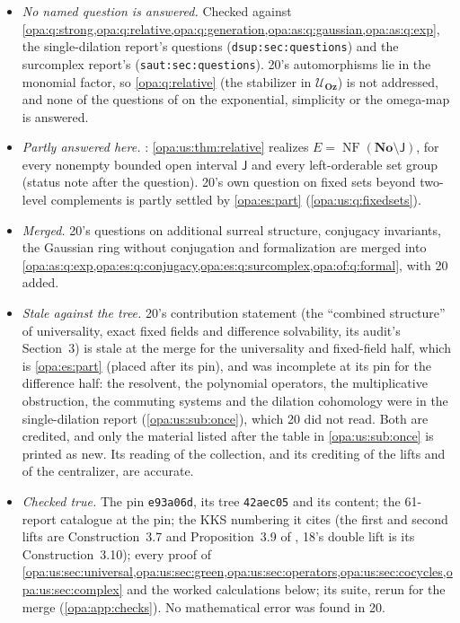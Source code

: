 \documentclass[11pt,oneside]{article}
\numberwithin{equation}{section}
\theoremstyle{definition}
\theoremstyle{remark}
\newcommand{\No}{\mathbf{No}}
\newcommand{\Oz}{\mathbf{Oz}}
\newcommand{\UU}{\mathcal U}
\newcommand{\lbl}[1]{\nolinkurl{#1}}
\newcommand{\NF}{\operatorname{NF}}
\begin{document}
\begin{itemize}[itemsep=2pt]
\item \emph{No named question is answered.} Checked against \cref{opa:q:strong,opa:q:relative,opa:q:generation,opa:as:q:gaussian,opa:as:q:exp}, the
single-dilation report's questions (\lbl{dsup:sec:questions}) and the surcomplex report's (\lbl{saut:sec:questions}). 20's automorphisms lie in the
monomial factor, so \cref{opa:q:relative} (the stabilizer in $\UU_\Oz$) is not addressed, and none of the questions of \cite[Section~5]{KKS} on the
exponential, simplicity or the omega-map is answered.
\item \emph{Partly answered here.} : \cref{opa:us:thm:relative} realizes $E=\NF(\No\setminus\mathsf J)$, for every nonempty
bounded open interval $\mathsf J$ and every left-orderable set group (status note after the question). 20's own question on fixed sets beyond two-level
complements is partly settled by \cref{opa:es:part} (\cref{opa:us:q:fixedsets}).
\item \emph{Merged.} 20's questions on additional surreal structure, conjugacy invariants, the Gaussian ring without conjugation and formalization
are merged into \cref{opa:as:q:exp,opa:es:q:conjugacy,opa:es:q:surcomplex,opa:of:q:formal}, with 20 added.
\item \emph{Stale against the tree.} 20's contribution statement (the ``combined structure'' of universality, exact fixed fields and difference
solvability, its audit's Section~3) is stale at the merge for the universality and fixed-field half, which is \cref{opa:es:part} (placed after its pin),
and was incomplete at its pin for the difference half: the resolvent, the polynomial operators, the multiplicative obstruction, the commuting systems
and the dilation cohomology were in the single-dilation report (\cref{opa:us:sub:once}), which 20 did not read. Both are credited, and only the
material listed after the table in \cref{opa:us:sub:once} is printed as new. Its reading of the collection, and its crediting of the lifts and of the
centralizer, are accurate.
\item \emph{Checked true.} The pin \texttt{e93a06d}, its tree \texttt{42aec05} and its content; the 61-report catalogue at the pin; the KKS numbering
it cites (the first and second lifts are Construction~3.7 and Proposition~3.9 of \cite{KKS}, 18's double lift is its Construction~3.10); every
proof of \cref{opa:us:sec:universal,opa:us:sec:green,opa:us:sec:operators,opa:us:sec:cocycles,opa:us:sec:complex} and the worked calculations below; its
suite, rerun for the merge (\cref{opa:app:checks}). No mathematical error was found in 20.
\end{itemize}
\end{document}

